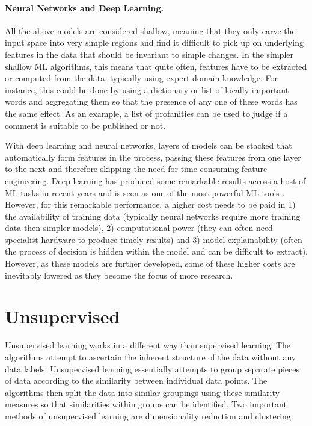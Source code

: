 \paragraph{Neural Networks and Deep Learning.} All the above models are considered shallow, meaning that they only carve the input space into very simple regions and find it difficult to pick up on underlying features in the data that should be invariant to simple changes. In the simpler shallow ML algorithms, this means that quite often, features have to be extracted or computed from the data, typically using expert domain knowledge. For instance, this could be done by using a dictionary or list of locally important words and aggregating them so that the presence of any one of these words has the same effect. As an example, a list of profanities can be used to judge if a comment is suitable to be published or not.

With deep learning and neural networks, layers of models can be stacked that automatically form features in the process, passing these features from one layer to the next and therefore skipping the need for time consuming feature engineering. Deep learning has produced some remarkable results across a host of ML tasks in recent years and is seen as one of the most powerful ML tools \parencite{lecun2015deep}. However, for this remarkable performance, a higher cost needs to be paid in 1) the availability of training data (typically neural networks require more training data then simpler models), 2) computational power (they can often need specialist hardware to produce timely results) and 3) model explainability (often the process of decision is hidden within the model and can be difficult to extract). However, as these models are further developed, some of these higher costs are inevitably lowered as they become the focus of more research.


\section{Unsupervised} Unsupervised learning works in a different way than supervised learning. The algorithms attempt to ascertain the inherent structure of the data without any data labels. Unsupervised learning essentially attempts to group separate pieces of data according to the similarity between individual data points. The algorithms then split the data into similar groupings using these similarity measures so that similarities within groups can be identified. Two important methods of unsupervised learning are dimensionality reduction and clustering.


